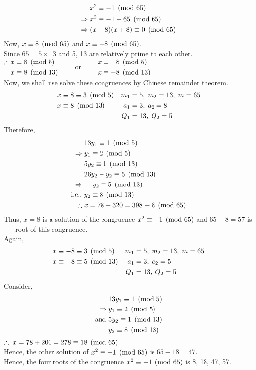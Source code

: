 \documentclass[12pt]{book}
\begin{document}
\begin{soln}
    \hfill
    \begin{align*}
        &x^2\equiv -1 \pmod{65}\\
        \Rightarrow\;&x^2\equiv -1+65 \pmod{65}\\
        \Rightarrow\;&(x-8)(x+8)\equiv 0 \pmod{65}\\
    \end{align*}
    Now, $ x\equiv 8 \pmod{65} $ and $ x\equiv -8 \pmod{65} $.\\
    Since $ 65=5\times 13 $ and 5, 13 are relatively prime to each other.\\
    $ \begin{aligned}
        \therefore\;&x\equiv 8 \pmod{5}\\
        &x\equiv 8 \pmod{13}\qquad
    \end{aligned} $ or $ \begin{aligned}
       \qquad &x\equiv -8 \pmod{5}\\
        &x\equiv -8 \pmod{13}
    \end{aligned} $\\
    Now, we shall use solve these congruences by Chinese remainder theorem.
    \begin{align*}
        &x\equiv 8\equiv 3 \pmod{5}&m_1&=5,\;m_2=13,\;m=65\\
        &x\equiv 8 \pmod{13}&a_1&=3,\;a_2=8\\
        &&Q_1&=13,\;Q_2=5
    \end{align*}
    Therefore,
    \begin{align*}
        &13y_1\equiv 1 \pmod{5}\\
        \Rightarrow\;&y_1\equiv 2 \pmod{5}\\
        &5y_2\equiv 1 \pmod{13}\\
        &26y_2-y_2\equiv 5 \pmod{13}\\
        \Rightarrow\;&-y_2\equiv 5 \pmod{13}\\
        \text{i.e., }&y_2\equiv 8 \pmod{13}\\
        \therefore\;&x=78+320=398\equiv 8 \pmod{65}
    \end{align*}
    Thus, $ x=8 $ is a solution of the congruence $ x^2\equiv -1 \pmod{65} $ and $ 65-8=57 $ is ---- root of this congruence.\\

    Again, 
    \begin{align*}
        &x\equiv -8\equiv 3 \pmod{5}&m_1&=5,\;m_2=13,\;m=65\\
        &x\equiv -8\equiv 5 \pmod{13}&a_1&=3,\;a_2=5\\
        &&Q_1&=13,\;Q_2=5
    \end{align*}
    Consider, 
    \begin{align*}
        &13y_1\equiv 1 \pmod{5}\\
        \Rightarrow\;&y_1\equiv 2 \pmod{5}\\
        \text{and }&5y_2\equiv 1 \pmod{13}\\
        &y_2\equiv 8 \pmod{13}\\
    \end{align*}
    $\therefore\;x=78+200=278\equiv 18 \pmod{65}$\\
    Hence, the other solution of $ x^2\equiv -1 \pmod{65} $ is $ 65-18=47 $.\\
    Hence, the four roots of the congruence $ x^2\equiv -1 \pmod{65} $ is 8, 18, 47, 57.
\end{soln}
\end{document}
